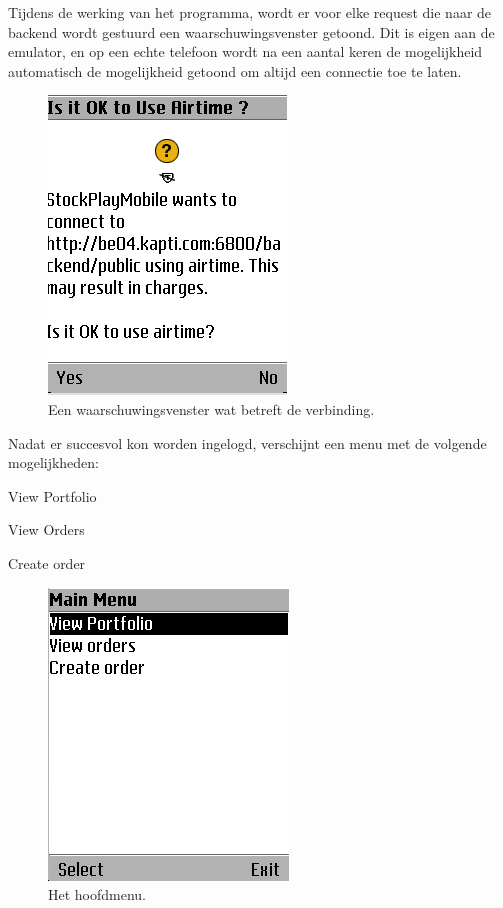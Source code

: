 Tijdens de werking van het programma, wordt er voor elke request die naar de backend wordt gestuurd een waarschuwingsvenster getoond. Dit is eigen aan de emulator, en op een echte telefoon wordt na een aantal keren de mogelijkheid automatisch de mogelijkheid getoond om altijd een connectie toe te laten.
\begin{figure}[h!]
	\centering
		\includegraphics[scale=0.75]{images/handleiding/mobile/ConnectionWarning}
	\caption{Een waarschuwingsvenster wat betreft de verbinding.}
	\label{fig:handl:mobile:warning}
\end{figure}

Nadat er succesvol kon worden ingelogd, verschijnt een menu met de volgende mogelijkheden:
\begin{itemize_compact}
	\item{View Portfolio}
	\item{View Orders}
	\item{Create order}
\end{itemize_compact}
\begin{figure}[h!]
	\centering
		\includegraphics[scale=0.75]{images/handleiding/mobile/Mainmenu}
	\caption{Het hoofdmenu.}
	\label{fig:handl:mobile:menu}
\end{figure}

